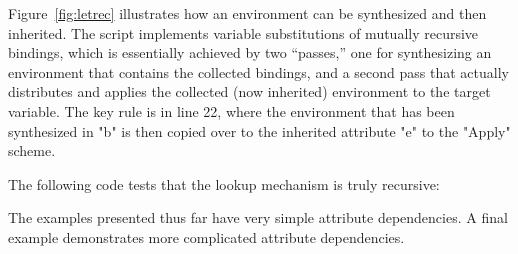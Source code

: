 \documentclass[11pt]{article} %
\begin{document}
\begin{example}
  Figure~\ref{fig:letrec} illustrates how an environment can be synthesized and then inherited. The
  \HAX script implements variable substitutions of mutually recursive bindings, which is essentially
  achieved by two ``passes,'' one for synthesizing an environment that contains the collected
  bindings, and a second pass that actually distributes and applies the collected (now inherited)
  environment to the target variable. The key rule is in line 22, where the environment that has
  been synthesized in "b" is then copied over to the inherited attribute "e" to the "Apply" scheme.

  The following code tests that the lookup mechanism is truly recursive:
\end{example}

The examples presented thus far have very simple attribute dependencies. A final example
demonstrates more complicated attribute dependencies.
\end{document}
